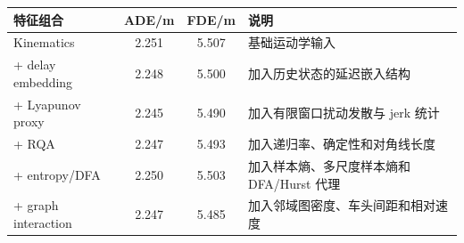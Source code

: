 \begin{tabularx}{\textwidth}{lccX}
\toprule
特征组合 & ADE/m & FDE/m & 说明 \\ 
\midrule
Kinematics & 2.251 & 5.507 & 基础运动学输入 \\ 
+ delay embedding & 2.248 & 5.500 & 加入历史状态的延迟嵌入结构 \\ 
+ Lyapunov proxy & 2.245 & 5.490 & 加入有限窗口扰动发散与 jerk 统计 \\ 
+ RQA & 2.247 & 5.493 & 加入递归率、确定性和对角线长度 \\ 
+ entropy/DFA & 2.250 & 5.503 & 加入样本熵、多尺度样本熵和 DFA/Hurst 代理 \\ 
+ graph interaction & 2.247 & 5.485 & 加入邻域图密度、车头间距和相对速度 \\ 
\bottomrule
\end{tabularx}
